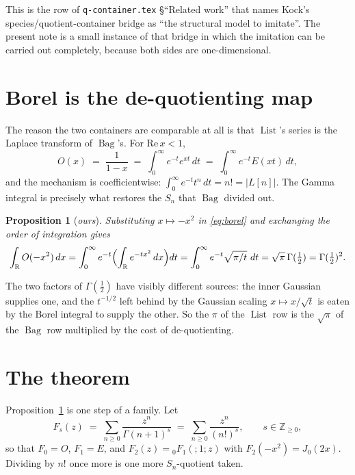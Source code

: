 \documentclass[11pt,a4paper]{article}
\newtheorem{proposition}[theorem]{Proposition}
\theoremstyle{definition}
\theoremstyle{remark}
\newcommand{\ZZ}{\mathbb{Z}}
\newcommand{\RR}{\mathbb{R}}
\newcommand{\norm}[1]{\lvert #1 \rvert}
\DeclareMathOperator{\Bag}{Bag}
\DeclareMathOperator{\List}{List}
\begin{document}
\noindent
This is the row of \texttt{q-container.tex} \S``Related work'' that names Kock's
species/quotient-container bridge as ``the structural model to imitate''. The
present note is a small instance of that bridge in which the imitation can be
carried out completely, because both sides are one-dimensional.

\section{Borel is the de-quotienting map}

The reason the two containers are comparable at all is that $\List$'s series is the
Laplace transform of $\Bag$'s. For $\mathrm{Re}\,x < 1$,
\begin{equation}\label{eq:borel}
  O(x) \;=\; \frac{1}{1-x} \;=\; \int_0^\infty e^{-t} e^{xt}\,dt \;=\; \int_0^\infty e^{-t}E(xt)\,dt,
\end{equation}
and the mechanism is coefficientwise: $\int_0^\infty e^{-t}t^n\,dt = n! = \norm{L[n]}$.
The Gamma integral is precisely what restores the $S_n$ that $\Bag$ divided out.

\begin{proposition}[\emph{ours}]\label{prop:two-gammas}
Substituting $x \mapsto -x^2$ in \eqref{eq:borel} and exchanging the order of
integration gives
\[
  \int_\RR O(-x^2)\,dx
  = \int_0^\infty e^{-t}\Bigl(\int_\RR e^{-tx^2}\,dx\Bigr) dt
  = \int_0^\infty e^{-t}\sqrt{\pi/t}\,\,dt
  = \sqrt{\pi}\,\Gamma(\tfrac12)
  = \Gamma(\tfrac12)^2 .
\]
\end{proposition}

The two factors of $\Gamma(\tfrac12)$ have visibly different sources: the inner
Gaussian supplies one, and the $t^{-1/2}$ left behind by the Gaussian scaling
$x \mapsto x/\sqrt{t}$ is eaten by the Borel integral to supply the other. So the
$\pi$ of the $\List$ row is the $\sqrt{\pi}$ of the $\Bag$ row multiplied by the cost
of de-quotienting.

\section{The theorem}

Proposition~\ref{prop:two-gammas} is one step of a family. Let
\[
  F_s(z) \;=\; \sum_{n \ge 0} \frac{z^n}{\Gamma(n+1)^s}
  \;=\; \sum_{n\ge0}\frac{z^n}{(n!)^s},
  \qquad s \in \ZZ_{\ge 0},
\]
so that $F_0 = O$, $F_1 = E$, and $F_2(z) = {}_0F_1(;1;z)$ with
$F_2(-x^2) = J_0(2x)$. Dividing by $n!$ once more is one more $S_n$-quotient taken.
\end{document}
